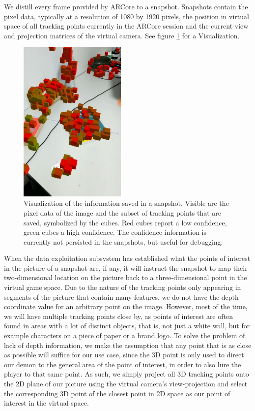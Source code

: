 We distill every frame provided by ARCore to a snapshot.
Snapshots contain the pixel data, typically at a resolution of 1080 by 1920 pixels, the position in virtual space of all tracking points currently in the ARCore session and the current view and projection matrices of the virtual camera. See figure \ref{fig:snapshot_data} for a Visualization.

\begin{figure}
    \includegraphics[height=8cm]{graphics/snapshot-points.jpg}
    \caption{Visualization of the information saved in a snapshot. Visible are the pixel data of the image and the subset of tracking points that are saved, symbolized by the cubes. Red cubes report a low confidence, green cubes a high confidence. The confidence information is currently not persisted in the snapshots, but useful for debugging.}
    \label{fig:snapshot_data}
\end{figure}

When the data exploitation subsystem has established what the points of interest in the picture of a snapshot are, if any, it will instruct the snapshot to map their two-dimensional location on the picture back to a three-dimensional point in the virtual game space.
Due to the nature of the tracking points only appearing in segments of the picture that contain many features, we do not have the depth coordinate value for an arbitrary point on the image.
However, most of the time, we will have multiple tracking points close by, as points of interest are often found in areas with a lot of distinct objects, that is, not just a white wall, but for example characters on a piece of paper or a brand logo.
To solve the problem of lack of depth information, we make the assumption that any point that is as close as possible will suffice for our use case, since the 3D point is only used to direct our demon to the general area of the point of interest, in order to also lure the player to that same point.
As such, we simply project all 3D tracking points onto the 2D plane of our picture using the virtual camera's view-projection and select the corresponding 3D point of the closest point in 2D space as our point of interest in the virtual space.

